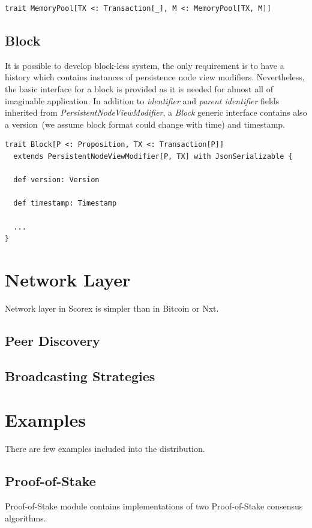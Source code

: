 \documentclass[]{report}   %
\begin{document}
\begin{lstlisting}
trait MemoryPool[TX <: Transaction[_], M <: MemoryPool[TX, M]]
\end{lstlisting}


\subsection{Block}

It is possible to develop block-less system, the only requirement is to have a history which contains instances of persistence node view modifiers. Nevertheless, the basic interface for a block is provided as it is needed for almost all of imaginable application. In addition to \textit{identifier} and \textit{parent identifier} fields inherited from \textit{PersistentNodeViewModifier}, a \textit{Block} generic interface contains also a version~(we assume block format could change with time) and timestamp.

\begin{lstlisting}
trait Block[P <: Proposition, TX <: Transaction[P]]
  extends PersistentNodeViewModifier[P, TX] with JsonSerializable {

  def version: Version

  def timestamp: Timestamp

  ...
}
\end{lstlisting}

\section{Network Layer}

Network layer in Scorex is simpler than in Bitcoin or Nxt. 

\subsection{Peer Discovery}

\subsection{Broadcasting Strategies}

\section{Examples}
There are few examples included into the distribution.

\subsection{Proof-of-Stake}
Proof-of-Stake module contains implementations of two Proof-of-Stake consensus algorithms. 
\end{document}
